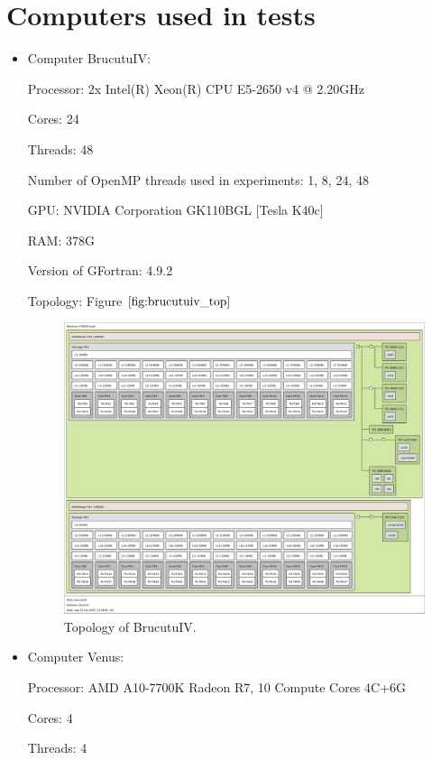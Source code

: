 \chapter{Computers used in tests}
\label{cap:ape}

\begin{itemize}
	\item Computer BrucutuIV:

		Processor: 2x Intel(R) Xeon(R) CPU E5-2650 v4 @ 2.20GHz
		
		Cores: 24
		
		Threads: 48
		
		Number of OpenMP threads used in experiments: 1, 8, 24, 48

		GPU: NVIDIA Corporation GK110BGL [Tesla K40c]
		
		RAM: 378G

		Version of GFortran: 4.9.2

		Topology: Figure $\ref{fig:brucutuiv_top}$

		\begin{figure}[htb]
		\centering \includegraphics[scale=0.425,angle=90]{figuras/brucutuiv}
		\caption{\label{fig:brucutuiv_top}Topology of BrucutuIV.}
		\end{figure}


	\item Computer Venus:

		Processor: AMD A10-7700K Radeon R7, 10 Compute Cores 4C+6G

		Cores: 4

		Threads: 4


\end{itemize}
